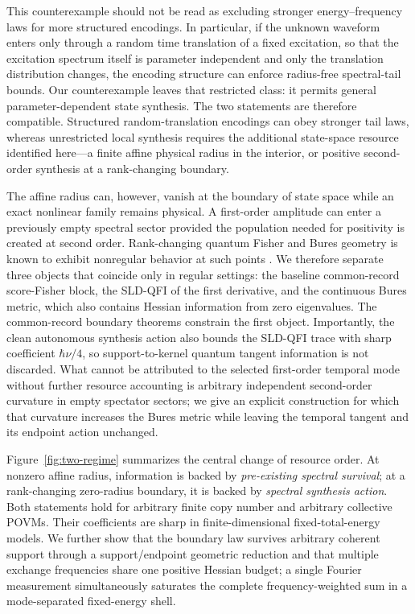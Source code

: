 This counterexample should not be read as excluding stronger energy--frequency laws for more structured encodings. In particular, if the unknown waveform enters only through a random time translation of a fixed excitation, so that the excitation spectrum itself is parameter independent and only the translation distribution changes, the encoding structure can enforce radius-free spectral-tail bounds. Our counterexample leaves that restricted class: it permits general parameter-dependent state synthesis. The two statements are therefore compatible. Structured random-translation encodings can obey stronger tail laws, whereas unrestricted local synthesis requires the additional state-space resource identified here---a finite affine physical radius in the interior, or positive second-order synthesis at a rank-changing boundary.

The affine radius can, however, vanish at the boundary of state space while an exact nonlinear family remains physical. A first-order amplitude can enter a previously empty spectral sector provided the population needed for positivity is created at second order. Rank-changing quantum Fisher and Bures geometry is known to exhibit nonregular behavior at such points \cite{Safranek2017}. We therefore separate three objects that coincide only in regular settings: the baseline common-record score-Fisher block, the SLD-QFI of the first derivative, and the continuous Bures metric, which also contains Hessian information from zero eigenvalues. The common-record boundary theorems constrain the first object. Importantly, the clean autonomous synthesis action also bounds the SLD-QFI trace with sharp coefficient $\hbar\nu/4$, so support-to-kernel quantum tangent information is not discarded. What cannot be attributed to the selected first-order temporal mode without further resource accounting is arbitrary independent second-order curvature in empty spectator sectors; we give an explicit construction for which that curvature increases the Bures metric while leaving the temporal tangent and its endpoint action unchanged.

Figure~\ref{fig:two-regime} summarizes the central change of resource order. At nonzero affine radius, information is backed by \emph{pre-existing spectral survival}; at a rank-changing zero-radius boundary, it is backed by \emph{spectral synthesis action}. Both statements hold for arbitrary finite copy number and arbitrary collective POVMs. Their coefficients are sharp in finite-dimensional fixed-total-energy models. We further show that the boundary law survives arbitrary coherent support through a support/endpoint geometric reduction and that multiple exchange frequencies share one positive Hessian budget; a single Fourier measurement simultaneously saturates the complete frequency-weighted sum in a mode-separated fixed-energy shell.

